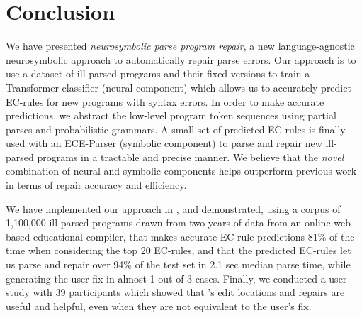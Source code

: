 \section{Conclusion}
\label{sec:conclusion}

We have presented \emph{neurosymbolic parse program repair}, a new
language-agnostic neurosymbolic approach to automatically repair parse errors.
%
Our approach is to use a dataset of ill-parsed programs and their fixed versions
to train a Transformer classifier (neural component) which allows us to
accurately predict EC-rules for new programs with syntax errors. In order to
make accurate predictions, we abstract the low-level program token sequences
using partial parses and probabilistic grammars. A small set of predicted
EC-rules is finally used with an ECE-Parser (symbolic component) to parse and
repair new ill-parsed programs in a tractable and precise manner. We believe
that the \emph{novel} combination of neural and symbolic components helps
outperform previous work in terms of repair accuracy and efficiency.

We have implemented our approach in \toolname, and demonstrated, using a corpus
of 1,100,000 ill-parsed \python programs drawn from two years of data from an
online web-based educational compiler, that \toolname makes accurate EC-rule
predictions 81\% of the time when considering the top 20 EC-rules, and that the
predicted EC-rules let us parse and repair over 94\% of the test set in 2.1 sec
median parse time, while generating the user fix in almost 1 out of 3 cases.
%
Finally, we conducted a user study with 39 participants which showed that
\toolname's edit locations and repairs are useful and helpful, even when they
are not equivalent to the user's fix.
